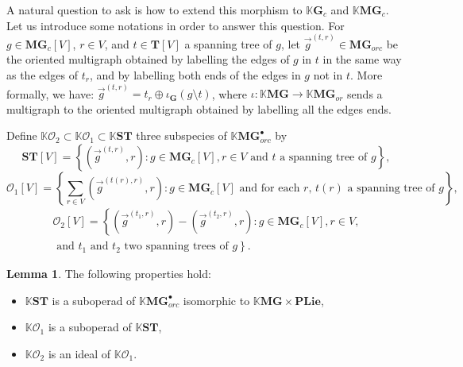 \documentclass[a4paper]{article}
\theoremstyle{definition}
\newtheorem{lemma}[definition]{Lemma}
\newcommand{\K}{\mathbb{K}}
\newcommand{\Operad}{\mathcal{O}}
\newcommand{\PLie}{\mathbf{PLie}}
\newcommand{\MG}{\mathbf{MG}}
\newcommand{\G}{\mathbf{G}}
\newcommand{\T}{\mathbf{T}}
\newcommand{\ST}{\mathbf{ST}}
\begin{document}

A natural question to ask is how to extend this morphism to $\K \G_c$ and $\K \MG_c$. Let us
introduce some notations in order to answer this question. For $g\in \MG_c[V]$, $r\in V$,
and $t\in \T[V]$ a spanning tree of $g$, let $\overrightarrow{g}^{(t,r)}\in \MG_{orc}$ be
the oriented multigraph obtained by labelling the edges of $g$ in $t$ in the same way as the
edges of $t_r$, and by labelling both ends of the edges in $g$ not in $t$. More formally, we
have: $\overrightarrow{g}^{(t,r)}=t_{r}\oplus\iota_{\G}(g\setminus t)$, where $\iota: \K
\MG\rightarrow \K \MG_{or}$ sends a multigraph to the oriented multigraph obtained by
labelling all the edges ends.


Define $\K \Operad_2\subset \K\Operad_1\subset\K \ST$ three subspecies of $\K
\MG_{orc}^{\bullet}$ by
\begin{equation}
    \ST[V]=\left\{
        (\overrightarrow{g}^{(t,r)},r) : g\in \MG_c[V], r\in V \text{ and $t$ a
    spanning tree of $g$}\right\},
\end{equation}
\begin{equation}
    \Operad_1[V] = \left\{\sum_{r\in V} (\overrightarrow{g}^{(t(r),r)},r) : g\in
    \MG_c[V]\text{ and for each $r$, $t(r)$ a spanning tree of $g$}\right\},
\end{equation}
\begin{multline}
    \Operad_2[V]=
    \left\{(\overrightarrow{g}^{(t_1,r)},r)-(\overrightarrow{g}^{(t_2,r)},r) : g\in
    \MG_c[V],r\in V,
    \right. \\ \left.
    \text{ and $t_1$ and $t_2$ two spanning trees of $g$}\right\}.
\end{multline}


\begin{lemma} \label{lemmfond}
The following properties hold:
\begin{itemize}
	\item $\K \ST$ is a suboperad of $\K \MG_{orc}^{\bullet}$ isomorphic to $\K\MG\times\PLie$,
	\item $\K \Operad_1$ is a suboperad of $\K \ST$, 
	\item $\K\Operad_2$ is an ideal of $\K\Operad_1$.
\end{itemize}
\end{lemma}
\end{document}
